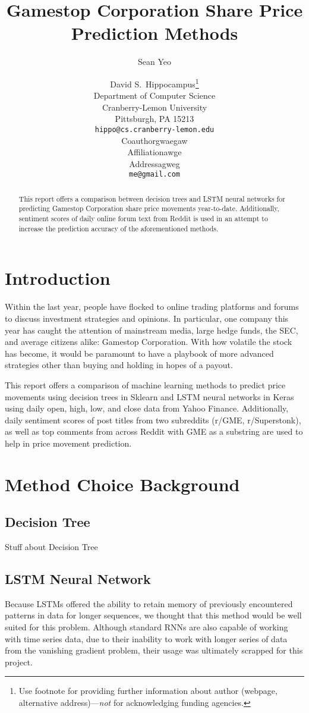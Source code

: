 \documentclass{article}
\title{Gamestop Corporation Share Price Prediction Methods}
\author{Sean Yeo}
\author{%
  David S.~Hippocampus\thanks{Use footnote for providing further information
    about author (webpage, alternative address)---\emph{not} for acknowledging
    funding agencies.} \\
  Department of Computer Science\\
  Cranberry-Lemon University\\
  Pittsburgh, PA 15213 \\
  \texttt{hippo@cs.cranberry-lemon.edu} \\
   \And
   Coauthorgwaegaw \\
   Affiliationawge \\
   Addressagweg \\
   \texttt{me@gmail.com} \\
}
\begin{document}
\nolinenumbers

\maketitle

\begin{abstract}
  This report offers a comparison between decision trees and LSTM neural networks for predicting Gamestop Corporation share price movements year-to-date. Additionally, sentiment scores of daily online forum text from Reddit is used in an attempt to increase the prediction accuracy of the aforementioned methods.
\end{abstract}

\section{Introduction}

Within the last year, people have flocked to online trading platforms and forums to discuss investment strategies and opinions. In particular, one company this year has caught the attention of mainstream media, large hedge funds, the SEC, and average citizens alike: Gamestop Corporation. With how volatile the stock has become, it would be paramount to have a playbook of more advanced strategies other than buying and holding in hopes of a payout.

This report offers a comparison of machine learning methods to predict price movements using decision trees in Sklearn and LSTM neural networks in Keras using daily open, high, low, and close data from Yahoo Finance. Additionally, daily sentiment scores of post titles from two subreddits (r/GME, r/Superstonk), as well as top comments from across Reddit with GME as a substring are used to help in price movement prediction.



\section{Method Choice Background}
\label{gen_inst}

\subsection{Decision Tree}
Stuff about Decision Tree
\subsection{LSTM Neural Network}
Because LSTMs offered the ability to retain memory of previously encountered patterns in data for longer sequences, we thought that this method would be well suited for this problem. Although standard RNNs are also capable of working with time series data, due to their inability to work with longer series of data from the vanishing gradient problem, their usage was ultimately scrapped for this project.
\end{document}
